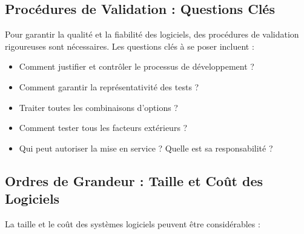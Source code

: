 \documentclass{article}
\begin{document}
\subsection{Procédures de Validation : Questions Clés}

Pour garantir la qualité et la fiabilité des logiciels, des procédures de validation rigoureuses sont nécessaires.  Les questions clés à se poser incluent :

\begin{itemize}
    \item Comment justifier et contrôler le processus de développement ?
    \item Comment garantir la représentativité des tests ?
    \item Traiter toutes les combinaisons d'options ?
    \item Comment tester tous les facteurs extérieurs ?
    \item Qui peut autoriser la mise en service ? Quelle est sa responsabilité ?
\end{itemize}

\subsection{Ordres de Grandeur : Taille et Coût des Logiciels}

La taille et le coût des systèmes logiciels peuvent être considérables :
\end{document}
